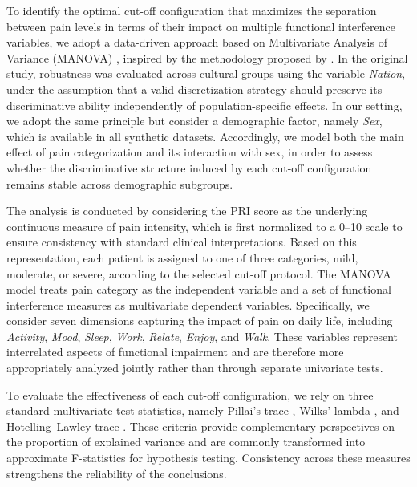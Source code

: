 \documentclass[preprint,12pt,authoryear]{elsarticle}
\begin{document}
To identify the optimal cut-off configuration that maximizes the separation between pain levels in terms of their impact on multiple functional interference variables, we adopt a data-driven approach based on Multivariate Analysis of Variance (MANOVA) \citep{o1985manova}, inspired by the methodology proposed by \citep{serlin1995cancer}. In the original study, robustness was evaluated across cultural groups using the variable \textit{Nation}, under the assumption that a valid discretization strategy should preserve its discriminative ability independently of population-specific effects. In our setting, we adopt the same principle but consider a demographic factor, namely \textit{Sex}, which is available in all synthetic datasets. Accordingly, we model both the main effect of pain categorization and its interaction with sex, in order to assess whether the discriminative structure induced by each cut-off configuration remains stable across demographic subgroups.

The analysis is conducted by considering the PRI score as the underlying continuous measure of pain intensity, which is first normalized to a 0--10 scale to ensure consistency with standard clinical interpretations. Based on this representation, each patient is assigned to one of three categories, mild, moderate, or severe, according to the selected cut-off protocol. The MANOVA model treats pain category as the independent variable and a set of functional interference measures as multivariate dependent variables. Specifically, we consider seven dimensions capturing the impact of pain on daily life, including \textit{Activity}, \textit{Mood}, \textit{Sleep}, \textit{Work}, \textit{Relate}, \textit{Enjoy}, and \textit{Walk}. These variables represent interrelated aspects of functional impairment and are therefore more appropriately analyzed jointly rather than through separate univariate tests.

To evaluate the effectiveness of each cut-off configuration, we rely on three standard multivariate test statistics, namely Pillai’s trace \citep{dasgupta2005p}, Wilks’ lambda \citep{alrawashdeh2017wilk}, and Hotelling–Lawley trace \citep{dasgupta2005awley}. These criteria provide complementary perspectives on the proportion of explained variance and are commonly transformed into approximate F-statistics for hypothesis testing. Consistency across these measures strengthens the reliability of the conclusions.
\end{document}
